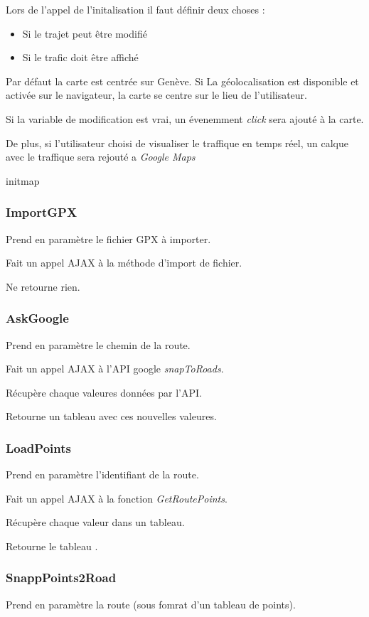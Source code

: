 \documentclass[a4paper]{article}
\newcommand{\gmap}{\emph{Google Maps}}
\newcommand{\diag}[1]{}
\begin{document}
Lors de l'appel de l'initalisation il faut définir deux choses :
\begin{itemize}
	\item Si le trajet peut être modifié
	\item Si le trafic doit être affiché
\end{itemize}

Par défaut la carte est centrée sur Genève. Si La géolocalisation est disponible et activée sur le navigateur, la carte se centre sur le lieu de l'utilisateur.

Si la variable de modification est vrai, un évenemment \emph{click} sera ajouté à la carte.

De plus, si l'utilisateur choisi de visualiser le traffique en temps réel, un calque avec le traffique sera rejouté a \gmap


\begin{center}
	\diag{initMap}
	\caption{initmap}
\end{center}

\subsubsection{ImportGPX}
Prend en paramètre le fichier GPX à importer.

Fait un appel AJAX à la méthode d'import de fichier.

Ne retourne rien.

\subsubsection{AskGoogle}
Prend en paramètre le chemin de la route.

Fait un appel AJAX à l'API google \emph{snapToRoads}.

Récupère chaque valeures données par l'API.

Retourne un tableau avec ces nouvelles valeures.

\subsubsection{LoadPoints}
Prend en paramètre l'identifiant de la route.

Fait un appel AJAX à la fonction \emph{GetRoutePoints}.

Récupère chaque valeur dans un tableau.

Retourne le tableau .

\subsubsection{SnappPoints2Road}
Prend en paramètre la route (sous fomrat d'un tableau de points).
\end{document}
